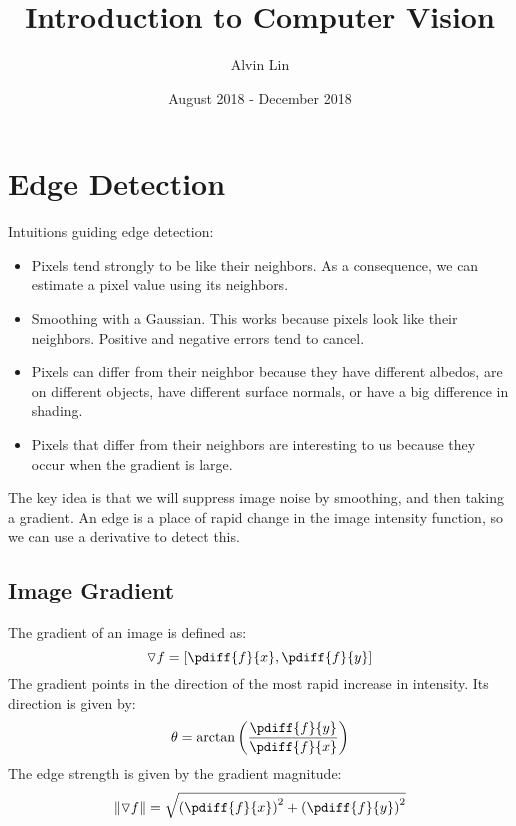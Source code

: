 \documentclass{math}
\title{Introduction to Computer Vision}
\author{Alvin Lin}
\date{August 2018 - December 2018}
\begin{document}
\maketitle

\section*{Edge Detection}
Intuitions guiding edge detection:
\begin{itemize}
  \item Pixels tend strongly to be like their neighbors. As a consequence, we
    can estimate a pixel value using its neighbors.
  \item Smoothing with a Gaussian. This works because pixels look like their
    neighbors. Positive and negative errors tend to cancel.
  \item Pixels can differ from their neighbor because they have different
    albedos, are on different objects, have different surface normals, or have
    a big difference in shading.
  \item Pixels that differ from their neighbors are interesting to us because
    they occur when the gradient is large.
\end{itemize}
The key idea is that we will suppress image noise by smoothing, and then taking
a gradient. An edge is a place of rapid change in the image intensity function,
so we can use a derivative to detect this.

\subsection*{Image Gradient}
The gradient of an image is defined as:
\[ \triangledown{f} = [\pdiff{f}{x},\pdiff{f}{y}] \]
The gradient points in the direction of the most rapid increase in intensity.
Its direction is given by:
\[ \theta = \arctan\left(\frac{\pdiff{f}{y}}{\pdiff{f}{x}}\right) \]
The edge strength is given by the gradient magnitude:
\[ \|\triangledown{f}\| = \sqrt{\left(\pdiff{f}{x}\right)^2+
  \left(\pdiff{f}{y}\right)^2} \]
\end{document}
